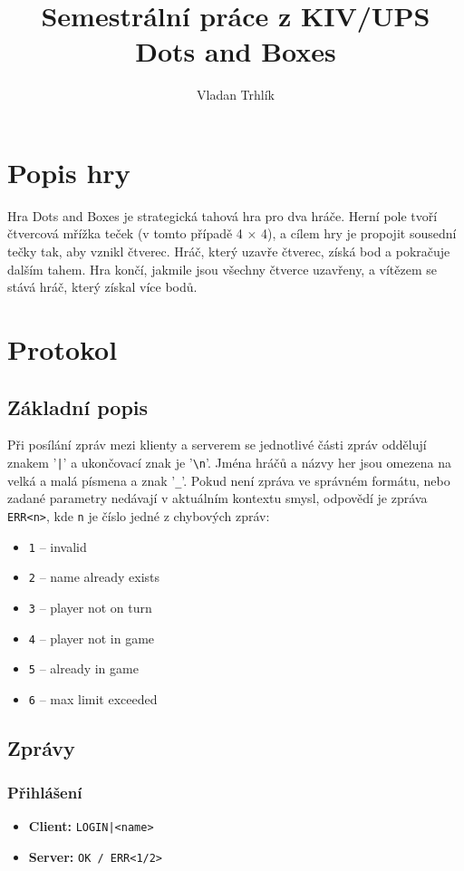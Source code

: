 \documentclass[11pt,a4paper]{article}
\author{Vladan Trhlík}
\title{%
	Semestrální práce z KIV/UPS \\
	\large Dots and Boxes  \\
}
\begin{document}
\maketitle

\section{Popis hry}
Hra Dots and Boxes je strategická tahová hra pro dva hráče. Herní pole tvoří čtvercová mřížka teček (v tomto případě 4 × 4), a cílem hry je propojit sousední tečky tak, aby vznikl čtverec. Hráč, který uzavře čtverec, získá bod a pokračuje dalším tahem. Hra končí, jakmile jsou všechny čtverce uzavřeny, a vítězem se stává hráč, který získal více bodů.
\section{Protokol}

\subsection{Základní popis}
Při posílání zpráv mezi klienty a serverem se jednotlivé části zpráv oddělují znakem '\texttt{|}' a ukončovací znak je '\texttt{\textbackslash n}'. Jména hráčů a názvy her jsou omezena na velká a malá písmena a znak '\texttt{\_}'. Pokud není zpráva ve správném formátu, nebo zadané parametry nedávají v aktuálním kontextu smysl, odpovědí je zpráva \texttt{ERR<n>}, kde \texttt{n} je číslo jedné z chybových zpráv:
\begin{itemize}
	\item \texttt{1} -- invalid
	\item \texttt{2} -- name already exists
	\item \texttt{3} -- player not on turn
	\item \texttt{4} -- player not in game
	\item \texttt{5} -- already in game
	\item \texttt{6} -- max limit exceeded
\end{itemize}

\subsection{Zprávy}
\subsubsection*{Přihlášení}
\begin{itemize}
	\item \textbf{Client:} \texttt{LOGIN|<name>}
	\item \textbf{Server:} \texttt{OK / ERR<1/2>}
\end{itemize}
\end{document}
